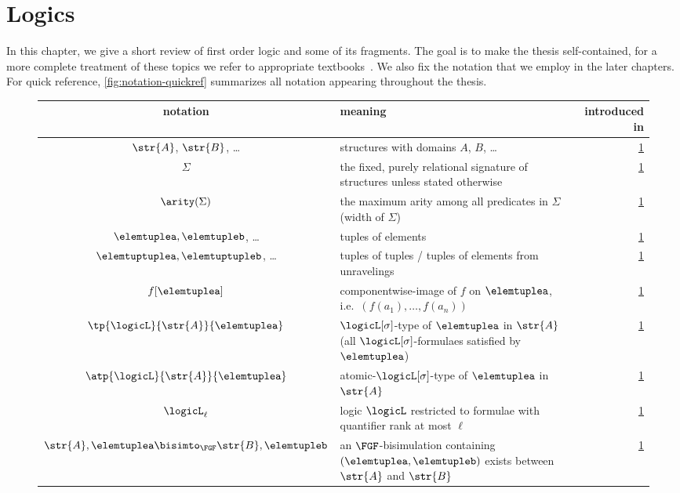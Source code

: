 \chapter{Logics}\label{chap:logics}

In this chapter, we give a short review of first order logic and some of its fragments.
The goal is to make the thesis self-contained, for a more complete treatment of these topics we refer to appropriate textbooks~\cite{Libkin04,monk1976}.
We also fix the notation that we employ in the later chapters.
For quick reference, \cref{fig:notation-quickref} summarizes all notation appearing throughout the thesis.
\begin{figure}[p]
  \centering
  \bgroup
  \def\arraystretch{1.1}
  \begin{tabularx}{\textwidth}{c X r}
    notation & meaning & introduced in \\
    \hline
    $\str{A}$, $\str{B}$, \ldots & structures with domains $A$, $B$, \ldots & \cref{chap:logics} \\
    $\Sigma$ & the fixed, purely relational signature of structures unless stated otherwise & \cref{chap:logics} \\
    $\arity(\Sigma)$ & the maximum arity among all predicates in $\Sigma$ (width of $\Sigma$) & \cref{chap:logics} \\
    $\elemtuplea, \elemtupleb$, \ldots & tuples of elements & \cref{chap:logics} \\
    $\elemtuptuplea, \elemtuptupleb$, \ldots & tuples of tuples / tuples of elements from unravelings & \cref{chap:logics} \\
    $f[\elemtuplea]$ & componentwise-image of $f$ on $\elemtuplea$, i.e.\ $(f(a_{1}), \ldots, f(a_{n}))$ & \cref{chap:logics} \\
    $\tp{\logicL}{\str{A}}{\elemtuplea}$ & $\logicL[\sigma]$-type of $\elemtuplea$ in $\str{A}$ (all $\logicL[\sigma]$-formulaes satisfied by $\elemtuplea$) & \cref{chap:logics} \\
    $\atp{\logicL}{\str{A}}{\elemtuplea}$ & atomic-$\logicL[\sigma]$-type of $\elemtuplea$ in $\str{A}$ & \cref{chap:logics} \\
    $\logicL_{\ell}$ & logic $\logicL$ restricted to formulae with quantifier rank at most $\ell$ & \cref{chap:logics} \\
    $\str{A}, \elemtuplea \bisimto_{\FGF} \str{B}, \elemtupleb$ & an $\FGF$-bisimulation containing $(\elemtuplea, \elemtupleb)$ exists between $\str{A}$ and $\str{B}$ & \cref{chap:logics} \\

\end{tabularx}
\end{figure}
